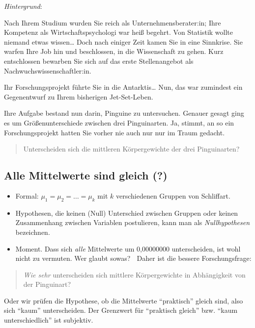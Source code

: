 \documentclass[
  a4paper,
  DIV=11]{scrreprt}
\theoremstyle{definition}
\theoremstyle{remark}
\begin{document}
\emph{Hintergrund}:

Nach Ihrem Studium wurden Sie reich als Unternehmensberater:in; Ihre
Kompetenz als Wirtschaftspsychologi war heiß begehrt. Von Statistik
wollte niemand etwas wissen\ldots{} Doch nach einiger Zeit kamen Sie in
eine Sinnkrise. Sie warfen Ihre Job hin und beschlossen, in die
Wissenschaft zu gehen. Kurz entschlossen bewarben Sie sich auf das erste
Stellenangebot als Nachwuchswissenschaftler:in.

Ihr Forschungsprojekt führte Sie in die Antarktis\ldots{} Nun, das war
zumindest ein Gegenentwurf zu Ihrem bisherigen Jet-Set-Leben.

Ihre Aufgabe bestand nun darin, Pinguine zu untersuchen. Genauer gesagt
ging es um Größenunterschiede zwischen drei Pinguinarten. Ja, stimmt, an
so ein Forschungsprojekt hatten Sie vorher nie auch nur nur im Traum
gedacht.

\begin{quote}
Unterscheiden sich die mittleren Körpergewichte der drei Pinguinarten?
\end{quote}

\hypertarget{alle-mittelwerte-sind-gleich}{%
\subsection{Alle Mittelwerte sind gleich
(?)}\label{alle-mittelwerte-sind-gleich}}

\begin{itemize}
\item
  Formal: \(\mu_1 = \mu_2 = \ldots = \mu_k\) mit \(k\) verschiedenen
  Gruppen von Schliffart.
\item
  Hypothesen, die keinen (Null) Unterschied zwischen Gruppen oder keinen
  Zusammenhang zwischen Variablen postulieren, kann man als
  \emph{Nullhypothesen} bezeichnen.
\item
  Moment. Dass sich \emph{alle} Mittelwerte um 0,00000000 unterscheiden,
  ist wohl nicht zu vermuten. Wer glaubt sowas? 🤔 Daher ist die bessere
  Forschungsfrage:
\end{itemize}

\begin{quote}
\emph{Wie sehr} unterscheiden sich mittlere Körpergewichte in
Abhängigkeit von der Pinguinart?
\end{quote}

Oder wir prüfen die Hypothese, ob die Mittelwerte ``praktisch'' gleich
sind, also sich ``kaum'' unterscheiden. Der Grenzwert für ``praktisch
gleich'' bzw. ``kaum unterschiedlich'' ist subjektiv.
\end{document}
